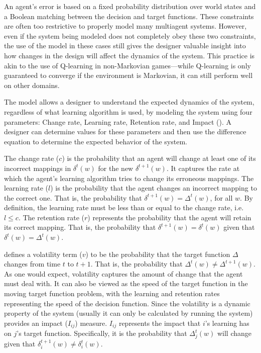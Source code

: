 

An agent's error is based on a fixed probability distribution over
world states and a Boolean matching between the decision and target
functions. These constraints are often too restrictive to properly
model many multiagent systems. However, even if the system being
modeled does not completely obey these two constraints, the use of the
 model in these cases still gives the designer valuable
insight into how changes in the design will affect the dynamics of the
system.  This practice is akin to the use of Q-learning in
non-Markovian games---while Q-learning is only guaranteed to converge
if the environment is Markovian, it can still perform well on other
domains.

The  model allows a designer to understand the expected
dynamics of the system, regardless of what learning algorithm is used,
by modeling the system using four parameters: Change rate, Learning
rate, Retention rate, and Impact (). A designer can
determine values for these parameters and then use the 
difference equation to determine the expected behavior of the system.

The change rate ($c$) is the probability that an agent will change at
least one of its incorrect mappings in $\delta^t(w)$ for the new
$\delta^{t+1}(w)$. It captures the rate at which the agent's learning
algorithm tries to change its erroneous mappings. The learning rate
($l$) is the probability that the agent changes an incorrect mapping
to the correct one. That is, the probability that $\delta^{t+1}(w) =
\Delta^t(w)$, for all $w$. By definition, the learning rate must be
less than or equal to the change rate, i.e. $l \leq c$. The retention
rate ($r$) represents the probability that the agent will retain its
correct mapping. That is, the probability that $\delta^{t+1}(w) =
\delta^t(w)$ given that $\delta^t(w) = \Delta^t(w)$.

 defines a volatility term ($v$) to be the probability that
the target function $\Delta$ changes from time $t$ to $t+1$. That is,
the probability that $\Delta^t(w) \neq \Delta^{t+1}(w)$. As one would
expect, volatility captures the amount of change that the agent must
deal with. It can also be viewed as the speed of the target function
in the moving target function problem, with the learning and retention
rates representing the speed of the decision function. Since the
volatility is a dynamic property of the system (usually it can only be
calculated by running the system)  provides an impact
($I_{ij}$) measure. $I_{ij}$ represents the impact that $i$'s learning
has on $j$'s target function. Specifically, it is the probability that
$\Delta_j^t(w)$ will change given that $\delta_i^{t+1}(w) \neq
\delta_i^t(w)$.

